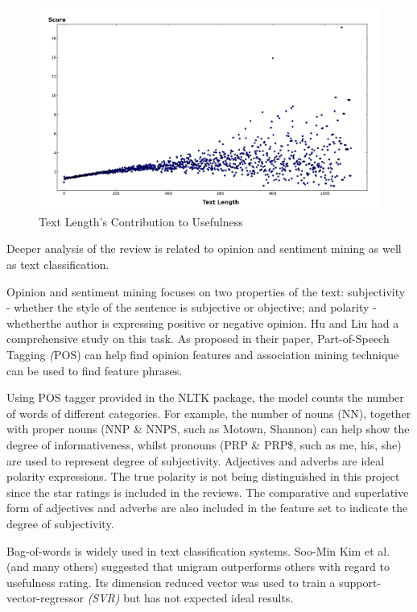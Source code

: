 \documentclass[a4paper,12pt,title]{article}
\begin{document}
\begin{figure}
\centerline{\includegraphics[width=500pt]{graph/length_score.png}}
\caption{Text Length's Contribution to Usefulness}
\label{fig:length}
\end{figure}

Deeper analysis of the review is related to opinion and sentiment mining as well as text classification.

Opinion and sentiment mining focuses on two properties of the text: subjectivity - whether the style of the sentence is subjective or objective; and polarity - whetherthe author is expressing positive or negative opinion. Hu and Liu had a comprehensive study\cite{summarizeopinion} on this task. As proposed in their paper, Part-of-Speech Tagging \textit(POS) can help find opinion features and association mining technique\cite{apriori} can be used to find feature phrases.

Using POS tagger provided in the NLTK package, the model counts the number of words of different categories. For example, the number of nouns (NN), together with proper nouns (NNP \& NNPS, such as Motown, Shannon) can help show the degree of informativeness, whilst pronouns (PRP \& PRP\$, such as me, his, she) are used to represent degree of subjectivity. Adjectives and adverbs are ideal polarity expressions. The true polarity is not being distinguished in this project since the star ratings is included in the reviews. The comparative and superlative form of adjectives and adverbs are also included in the feature set to indicate the degree of subjectivity. 

Bag-of-words is widely used in text classification systems. Soo-Min Kim et al.\cite{empirical} (and many others) suggested that unigram outperforms others with regard to usefulness rating. Its dimension reduced vector was used to train a support-vector-regressor \textit{(SVR)} but has not expected ideal results.
\end{document}
